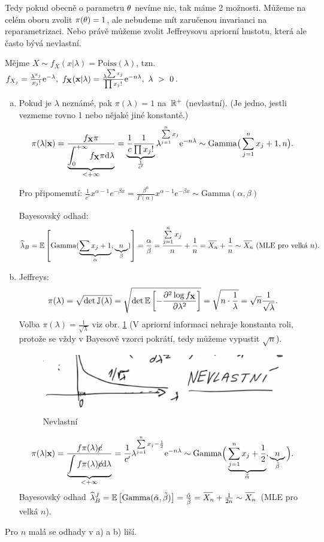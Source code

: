 Tedy pokud obecně o parametru $\theta$ nevíme nic, tak máme 2 možnosti. Můžeme na celém oboru zvolit $\pi(\theta)=1$, ale nebudeme mít zaručenou invarianci na reparametrizaci. Nebo právě můžeme zvolit Jeffreysovu apriorní hustotu, která ale často bývá nevlastní.
\begin{example}
	Mějme $X\sim f_X(x|\lambda)=\mathrm{Poiss}(\lambda)$, tzn. $f_{X_j}=\frac{\lambda^{x_j}}{x_j!}\mathrm{e}^{-\lambda},~f_\textbf{X}(\textbf{x}|\lambda)=\frac{\lambda^{\sum x_j}}{\prod x_j!}\mathrm{e}^{-n\lambda},~\lambda~>~0$.\begin{enumerate}[a)]
		\item Pokud je $\lambda$ neznámé, pak $\pi(\lambda)=1$ na~$\mathbb{R}^+$ (nevlastní). (Je jedno, jestli vezmeme rovno 1 nebo nějaké jiné konstantě.)
		$$
		\pi(\lambda|\textbf{x})=\frac{f_{\textbf{X}} \pi}{\underbrace{\int_{0}^{+\infty}f_{\textbf{X}}\pi\mathrm{d}\lambda}_{<+\infty}}=\underbrace{\frac{1}{c}\frac{1}{\prod x_j!}}_{\frac{1}{c'}}\lambda^{\sum\limits_{j=1}^{n} x_j}\mathrm{e}^{-n\lambda}\sim\mathrm{Gamma}\big(\sum\limits_{j=1}^{n} x_j+1,n\big).$$
		
		Pro připomenutí: $\frac{1}{c'}x^{\alpha-1}e^{-\beta x}=\frac{\beta^{\alpha}}{\Gamma(\alpha)}x^{\alpha-1}e^{-\beta x } \sim \mathrm{Gamma}(\alpha,\beta) $
		
		Bayesovský odhad:
		 $$\widehat{\lambda}_B=\EE{\mathrm{Gamma}(\underbrace{\sum x_j+1}_{\alpha},\underbrace{n}_\beta)}=\frac{\alpha}{\beta}=\frac{\sumjn x_j}{n}+\frac{1}{n}=\Oxn+\frac{1}{n}\sim \Oxn~(\text{MLE pro velká }n).$$
		\item Jeffreys: $$\pi(\lambda)=\sqrt{\det \mathbb{J}(\lambda)}=\sqrt{\det \mathbb{E}\left[ -\frac{\partial^2\log f_{\textbf{X}}}{\partial\lambda^2} \right]}=\sqrt{n\cdot\frac{1}{\lambda}}=\sqrt{n}\frac{1}{\sqrt{\lambda}}.$$
		Volba $\pi(\lambda)=\frac{1}{\sqrt{\lambda}}$ viz obr. \ref{fig:p72} (V apriorní informaci nehraje konstanta roli, protože se vždy v Bayesově vzorci pokrátí, tedy můžeme vypustit $\sqrt{n}$).
		\begin{figure}[h]
			\centering
			\includegraphics[width=0.5\linewidth]{pictures/P7_2}
			\caption{Nevlastní}
			\label{fig:p72}
		\end{figure}
		$$ \pi(\lambda|\textbf{x})=\frac{f \pi(\lambda)\cancel{c}}{\underbrace{\int f\pi(\lambda)\cancel{c}\mathrm{d}\lambda}_{<+\infty}}=\frac{1}{c'}\lambda^{\sum\limits_{j=1}^{n} x_j-\frac{1}{2}}\mathrm{e}^{-n\lambda}\sim\mathrm{Gamma}\Big(\underbrace{\sum\limits_{j=1}^{n} x_j+\frac{1}{2}}_{\tilde{\alpha}},\underbrace{n}_{\tilde{\beta}}\Big).$$
		Bayesovský odhad $\widehat{\lambda}_B^J=\EE{\mathrm{Gamma}(\tilde{\alpha},\tilde{\beta})}=\frac{\tilde{\alpha}}{\tilde{\beta}}=\Oxn+\frac{1}{2n}\sim\Oxn$ (MLE pro velká $n$).
	\end{enumerate}
	Pro $n$ malá se odhady v a) a b) liší.
\end{example}

